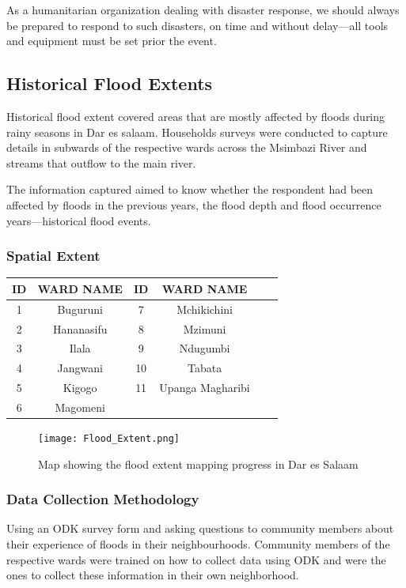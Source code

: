 \documentclass[a4paper,12pt,twoside]{article}
\begin{document}
As a humanitarian organization dealing with disaster response, we should always be prepared to respond to such disasters, on time and without delay---all tools and equipment must be set prior the event.

\newpage
\subsection{Historical Flood Extents}
Historical flood extent covered areas that are mostly affected by floods during rainy seasons in Dar es salaam. Households surveys were conducted to capture details in  subwards of the respective wards across the Msimbazi River and streams that outflow to the main river.

The information captured aimed to know whether the respondent had been affected by floods in the previous years, the flood depth and flood occurrence years---historical flood events.


\subsubsection{Spatial Extent}

\begin{center}
\begin{tabular}{|c|c|c|c|c|c|}
\hline
ID & WARD NAME & ID & WARD NAME\\
\hline
1 & Buguruni & 7 & Mchikichini\\
2 & Hananasifu & 8 & Mzimuni\\
3 & Ilala & 9 & Ndugumbi\\
4 & Jangwani & 10 & Tabata\\
5 & Kigogo & 11 & Upanga Magharibi\\
6 &  Magomeni & {} & {} \\
 \hline
\end{tabular}
\end{center}

\begin{figure}[h]
  \color{RHgreen}\caption{Map showing the flood extent mapping progress in Dar es Salaam}
  \centering
 \texttt{[image: Flood\_Extent.png]}
\end{figure}

\subsubsection{Data Collection Methodology}
Using an ODK survey form and asking questions to community members about their experience of floods in their neighbourhoods. Community members of the respective wards were trained on how to collect data using ODK and were the ones to collect these information in their own neighborhood.
\end{document}
